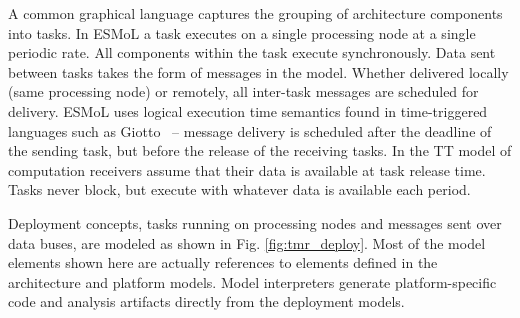 A common graphical language captures the grouping of architecture components into tasks.  In ESMoL a task executes on a single processing node at a single periodic rate.  All components within the task execute synchronously.  Data sent between tasks takes the form of messages in the model.  Whether delivered locally (same processing node) or remotely, all inter-task messages are scheduled for delivery.  ESMoL uses logical execution time semantics found in time-triggered languages such as Giotto~\cite{henzinger01giotto} -- message delivery is scheduled after the deadline of the sending task, but before the release of the receiving tasks.  In the TT model of computation receivers assume that their data is available at task release time.  Tasks never block, but execute with whatever data is available each period.

Deployment concepts, tasks running on processing nodes and messages sent over data buses, are modeled as shown in Fig. \ref{fig:tmr_deploy}.  Most of the model elements shown here are actually references to elements defined in the architecture and platform models.  Model interpreters generate platform-specific code and analysis artifacts directly from the deployment models.






